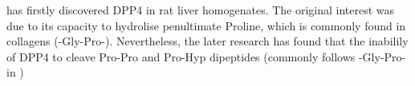 \citet{Hopsu-Havu1966} has firstly discovered DPP4 in rat liver homogenates. The original interest was due to its capacity to hydrolise penultimate Proline, which is commonly found in collagens (-Gly-Pro-). Nevertheless, the later research has found that the inabilily of DPP4 to cleave Pro-Pro and Pro-Hyp dipeptides (commonly follows -Gly-Pro- in )